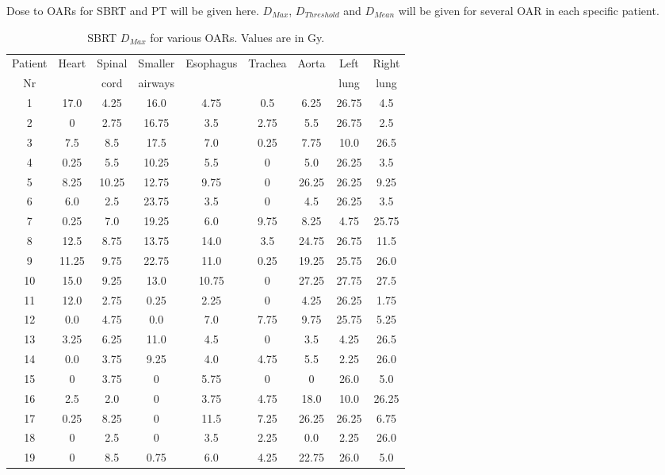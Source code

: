 \documentclass[type=dr, dr=rernat, accentcolor=tud7b,colorbacktitle, bigchapter, openright, twoside, 12pt ]{tudthesis}
\begin{document}
Dose to OARs for SBRT and PT will be given here. $D_{Max}$, $D_{Threshold}$ and $D_{Mean}$ will be given for several OAR in each specific patient.

\begin{table}[H]
  \centering
  \caption{SBRT $D_{Max}$ for various OARs. Values are in Gy.}
  \begin{tabular}{c|c|c|c|c|c|c|c|c}
   Patient & \multirow{2}{*}{Heart} & Spinal  & Smaller  & \multirow{2}{*}{Esophagus} & \multirow{2}{*}{Trachea} & \multirow{2}{*}{Aorta} & Left  & Right \\
   Nr & & cord & airways & & & & lung & lung \\
 \hline\hline 
1 & 17.0 & 4.25 & 16.0 & 4.75 & 0.5 & 6.25 & 26.75 & 4.5\\
2 & 0 & 2.75 & 16.75 & 3.5 & 2.75 & 5.5 & 26.75 & 2.5\\
3 & 7.5 & 8.5 & 17.5 & 7.0 & 0.25 & 7.75 & 10.0 & 26.5\\
4 & 0.25 & 5.5 & 10.25 & 5.5 & 0 & 5.0 & 26.25 & 3.5\\
5 & 8.25 & 10.25 & 12.75 & 9.75 & 0 & 26.25 & 26.25 & 9.25\\
6 & 6.0 & 2.5 & 23.75 & 3.5 & 0 & 4.5 & 26.25 & 3.5\\
7 & 0.25 & 7.0 & 19.25 & 6.0 & 9.75 & 8.25 & 4.75 & 25.75\\
8 & 12.5 & 8.75 & 13.75 & 14.0 & 3.5 & 24.75 & 26.75 & 11.5\\
9 & 11.25 & 9.75 & 22.75 & 11.0 & 0.25 & 19.25 & 25.75 & 26.0\\
10 & 15.0 & 9.25 & 13.0 & 10.75 & 0 & 27.25 & 27.75 & 27.5\\
11 & 12.0 & 2.75 & 0.25 & 2.25 & 0 & 4.25 & 26.25 & 1.75\\
12 & 0.0 & 4.75 & 0.0 & 7.0 & 7.75 & 9.75 & 25.75 & 5.25\\
13 & 3.25 & 6.25 & 11.0 & 4.5 & 0 & 3.5 & 4.25 & 26.5\\
14 & 0.0 & 3.75 & 9.25 & 4.0 & 4.75 & 5.5 & 2.25 & 26.0\\
15 & 0 & 3.75 & 0 & 5.75 & 0 & 0 & 26.0 & 5.0\\
16 & 2.5 & 2.0 & 0 & 3.75 & 4.75 & 18.0 & 10.0 & 26.25\\
17 & 0.25 & 8.25 & 0 & 11.5 & 7.25 & 26.25 & 26.25 & 6.75\\
18 & 0 & 2.5 & 0 & 3.5 & 2.25 & 0.0 & 2.25 & 26.0\\
19 & 0 & 8.5 & 0.75 & 6.0 & 4.25 & 22.75 & 26.0 & 5.0\\
\hline\hline
  \end{tabular}
  \label{tab:oarlimits}
\end{table}
\end{document}
